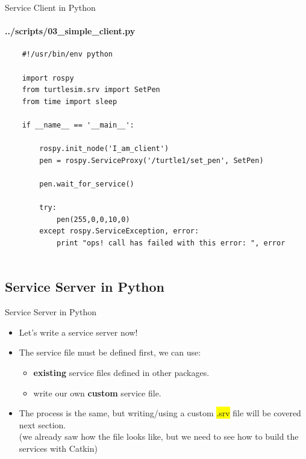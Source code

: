 \documentclass{beamer}
\begin{document}
\begin{frame}[fragile]{Service Client in Python}
    \framesubtitle{   ../scripts/03\_simple\_client.py}
    \begin{lstlisting}
    #!/usr/bin/env python
    
    import rospy
    from turtlesim.srv import SetPen
    from time import sleep
    
    if __name__ == '__main__':
    
        rospy.init_node('I_am_client') 
        pen = rospy.ServiceProxy('/turtle1/set_pen', SetPen)
        
        pen.wait_for_service()
        
        try:
            pen(255,0,0,10,0)      
        except rospy.ServiceException, error:
            print "ops! call has failed with this error: ", error 
    
    \end{lstlisting}
\end{frame}

    
\subsection{Service Server in Python}

\begin{frame}{Service Server in Python}
    \begin{itemize}
        \item Let's write a service server now!
        \vspace{5mm}
        \item The service file must be defined first, we can use:
        \vspace{5mm}
        \begin{itemize}
            \item \textbf{existing} service files defined in other packages.
        \vspace{2mm}            
            \item write our own \textbf{custom} service file.
        \end{itemize}
        \vspace{2mm}            
        \item The process is the same, but writing/using a custom {\ttfamily \colorbox{yellow}{.srv}} file will be covered next section.\\ \scriptsize{(we already saw how the file looks like, but we need to see how to build the services with Catkin)}
    \end{itemize}      
\end{frame}
\end{document}
